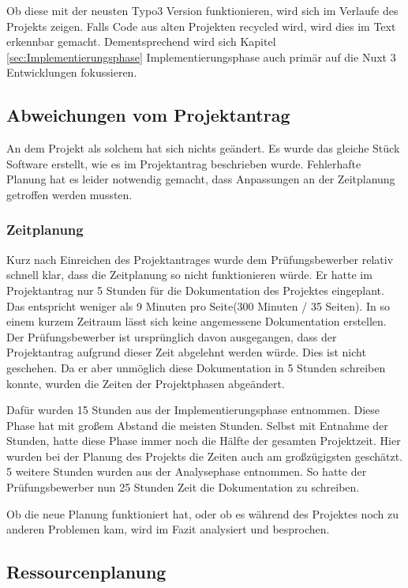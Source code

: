 Ob diese mit der neusten Typo3 Version funktionieren, wird sich im Verlaufe des Projekts zeigen. Falls Code aus alten Projekten recycled wird, wird dies im Text erkennbar gemacht. Dementsprechend wird sich Kapitel \ref{sec:Implementierungsphase} Implementierungsphase auch primär auf die Nuxt 3 Entwicklungen fokussieren.

\subsection{Abweichungen vom Projektantrag}
\label{sec:AbweichungenProjektantrag}

An dem Projekt als solchem hat sich nichts geändert. Es wurde das gleiche Stück Software erstellt, wie es im Projektantrag beschrieben wurde. Fehlerhafte Planung hat es leider notwendig gemacht, dass Anpassungen an der Zeitplanung getroffen werden mussten.


\subsubsection{Zeitplanung}
\label{sec:AbweichungenProjektantrag}

Kurz nach Einreichen des Projektantrages wurde dem Prüfungsbewerber relativ schnell klar, dass die Zeitplanung so nicht funktionieren würde. Er hatte im Projektantrag nur 5 Stunden für die Dokumentation des Projektes eingeplant. Das entspricht weniger als 9 Minuten pro Seite(300 Minuten / 35 Seiten). In so einem kurzem Zeitraum lässt sich keine angemessene Dokumentation erstellen. Der Prüfungsbewerber ist ursprünglich davon ausgegangen, dass der Projektantrag aufgrund dieser Zeit abgelehnt werden würde. Dies ist nicht geschehen. Da er aber unmöglich diese Dokumentation in 5 Stunden schreiben konnte, wurden die Zeiten der Projektphasen abgeändert. 

Dafür wurden 15 Stunden aus der Implementierungsphase entnommen. Diese Phase hat mit großem Abstand die meisten Stunden. Selbst mit Entnahme der Stunden, hatte diese Phase immer noch die Hälfte der gesamten Projektzeit. Hier wurden bei der Planung des Projekts die Zeiten auch am großzügigsten geschätzt. 5 weitere Stunden wurden aus der Analysephase entnommen. So hatte der Prüfungsbewerber nun 25 Stunden Zeit die Dokumentation zu schreiben.

Ob die neue Planung funktioniert hat, oder ob es während des Projektes noch zu anderen Problemen kam, wird im Fazit analysiert und besprochen.

\subsection{Ressourcenplanung}
\label{sec:Ressourcenplanung}

